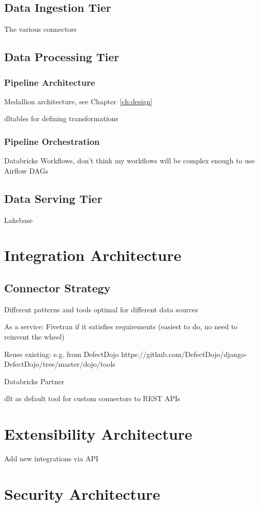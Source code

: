 \subsection{Data Ingestion Tier}

The various connectors

\subsection{Data Processing Tier}

\subsubsection{Pipeline Architecture}

Medallion architecture, see Chapter~\ref{ch:design}

\gls{dltables} for defining transformations

\subsubsection{Pipeline Orchestration}

Databricks Workflows, don't think my workflows will be complex enough to use Airflow DAGs

\subsection{Data Serving Tier}

Lakebase

\section{Integration Architecture}


\subsection{Connector Strategy}

Different patterns and tools optimal for different data sources

As a service: Fivetran if it satisfies requirements (easiest to do, no need to reinvent the wheel)

Reuse existing: e.g. from DefectDojo https://github.com/DefectDojo/django-DefectDojo/tree/master/dojo/tools

Databricks Partner

dlt as default tool for custom connectors to REST APIs


\section{Extensibility Architecture}

Add new integrations via API

\section{Security Architecture}